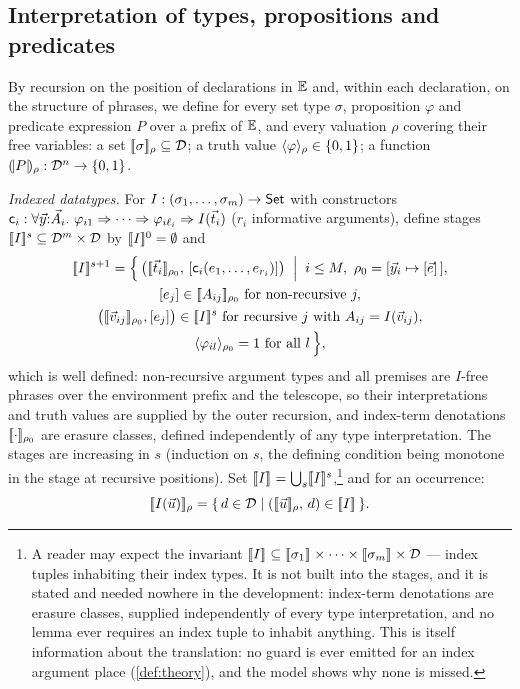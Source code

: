 \subsection{Interpretation of types, propositions and predicates}
\label{sec:semantics-interp}

\begin{definition}[Interpretations]
\label{def:interp}
By recursion on the position of declarations in $\mathbb{E}$ and, within each
declaration, on the structure of phrases, we define for every set type
$\sigma$, proposition $\varphi$ and predicate expression $P$ over a
prefix of $\mathbb{E}$, and every valuation $\rho$ covering their free
variables:
a set $[\![ \sigma ]\!]_{\rho} \subseteq \mathcal{D}$; a truth value
$\langle \varphi \rangle_{\rho} \in \{0,1\}$; a function $(\!| P |\!)_\rho : \mathcal{D}^n \to
\{0,1\}$.

\emph{Indexed datatypes.}  For $I : (\sigma_1, \dots, \sigma_m) \to
\mathsf{Set}$ with constructors $\mathsf{c}_i : \forall \vec{y}{:}\vec{A}_i.\
\varphi_{i1} \Rightarrow \dots \Rightarrow \varphi_{i\ell_i} \Rightarrow
I(\vec{t}_i)$ ($r_i$ informative arguments), define stages $[\![ I ]\!]^{s}
\subseteq \mathcal{D}^m \times \mathcal{D}$ by $[\![ I ]\!]^{0} = \emptyset$ and
\begin{multline*}
  \stage{I}{s+1} = \Bigl\{\, \bigl(\sem{\tup{t}_i}_{\rho_0},\,
    \cls{\wcns{c}_i(e_1, \dots, e_{r_i})}\bigr) \;\Bigm|\;
    i \le M,\ \rho_0 = [\tup{y}_i \mapsto \cls{\tup{e}}\,],\\
    \cls{e_j} \in \semr{A_{ij}}{\rho_0} \text{ for non-recursive } j,\\
    \bigl(\sem{\tup{v}_{ij}}_{\rho_0}, \cls{e_j}\bigr) \in \stage{I}{s}
    \text{ for recursive } j \text{ with } A_{ij} = I(\tup{v}_{ij}),\\
    \pvr{\varphi_{il}}{\rho_0} = 1 \text{ for all } l \,\Bigr\},
\end{multline*}
which is well defined: non-recursive argument types and all premises
are $I$-free phrases over the environment prefix and the telescope, so
their interpretations and truth values are supplied by the outer
recursion, and index-term denotations $[\![ \cdot ]\!]_{\rho_0}$ are erasure
classes, defined independently of any type interpretation.  The stages
are increasing in $s$ (induction on $s$, the defining condition being
monotone in the stage at recursive positions).  Set $[\![ I ]\!]_{} =
\bigcup_s [\![ I ]\!]^{s}$,\footnote{A reader may expect the invariant
$[\![ I ]\!]_{} \subseteq [\![ \sigma_1 ]\!]_{} \times \cdots \times
[\![ \sigma_m ]\!]_{} \times \mathcal{D}$ --- index tuples inhabiting their index
types.  It is not built into the stages, and it is stated and needed
nowhere in the development: index-term denotations are erasure
classes, supplied independently of every type interpretation, and no
lemma ever requires an index tuple to inhabit anything.  This is
itself information about the translation: no guard is ever emitted for
an index argument place (\cref{def:theory}), and the model shows why
none is missed.} and for an occurrence:
\[
  [\![ I(\vec{u}) ]\!]_{\rho} =
  \{\, d \in \mathcal{D} \mid ([\![ \vec{u} ]\!]_\rho,\, d) \in [\![ I ]\!]_{} \,\}.
\]


\end{definition}
